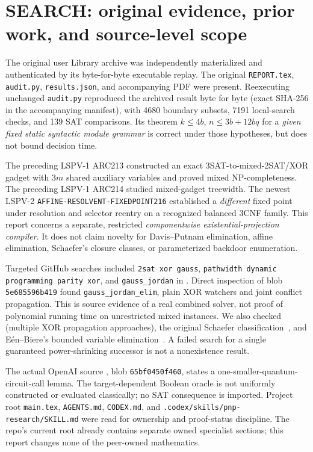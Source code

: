 \documentclass[11pt]{article}
\begin{document}
\section{SEARCH: original evidence, prior work, and source-level scope}
The original user Library archive  was independently materialized and authenticated by its byte-for-byte executable replay. The original \texttt{REPORT.tex}, \texttt{audit.py}, \texttt{results.json}, and accompanying PDF were present. Reexecuting unchanged \texttt{audit.py} reproduced the archived result byte for byte (exact SHA-256 in the accompanying manifest), with 4680 boundary subsets, 7191 local-search checks, and 139 SAT comparisons. Its theorem $k\le4b$, $n\le3b+12bq$ for a \emph{given fixed static syntactic module grammar} is correct under those hypotheses, but does not bound decision time.

The preceding LSPV-1 ARC213 constructed an exact 3SAT-to-mixed-2SAT/XOR gadget with $3m$ shared auxiliary variables and proved mixed NP-completeness. The preceding LSPV-1 ARC214 studied mixed-gadget treewidth. The newest LSPV-2 \texttt{AFFINE-RESOLVENT-FIXEDPOINT216} established a \emph{different} fixed point under resolution and selector reentry on a recognized balanced 3CNF family. This report concerns a separate, restricted \emph{componentwise existential-projection compiler}. It does not claim novelty for Davis--Putnam elimination, affine elimination, Schaefer's closure classes, or parameterized backdoor enumeration.

Targeted GitHub searches included \texttt{2sat xor gauss}, \texttt{pathwidth dynamic programming parity xor}, and \texttt{gauss\_jordan} in . Direct inspection of  blob \texttt{5e685596b419} found \texttt{gauss\_jordan\_elim}, plain XOR watchers and joint conflict propagation. This is source evidence of a real combined solver, not proof of polynomial running time on unrestricted mixed instances. We also checked  (multiple XOR propagation approaches), the original Schaefer classification~\cite{schaefer}, and E\'en--Biere's bounded variable elimination~\cite{eenbiere}. A failed search for a single guaranteed power-shrinking successor is not a nonexistence result.

The actual OpenAI source , blob \texttt{65bf0450f460}, states a one-smaller-quantum-circuit-call lemma. The target-dependent Boolean oracle is not uniformly constructed or evaluated classically; no SAT consequence is imported. Project root \texttt{main.tex}, \texttt{AGENTS.md}, \texttt{CODEX.md}, and \texttt{.codex/skills/pnp-research/SKILL.md} were read for ownership and proof-status discipline. The repo's current root already contains separate owned specialist sections; this report changes none of the peer-owned mathematics.
\end{document}
